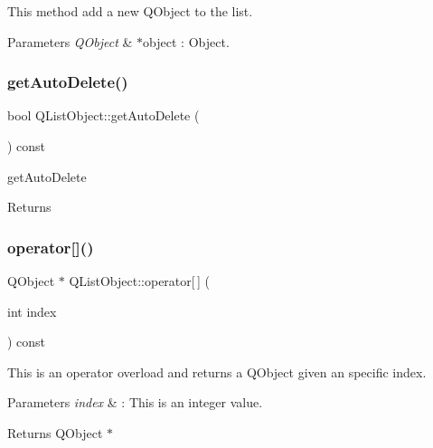 This method add a new Q\+Object to the list. 


\begin{DoxyParams}{Parameters}
{\em Q\+Object} & $\ast$object \+: Object. \\
\hline
\end{DoxyParams}
\mbox{\label{class_q_list_object_ad9d1f7e3c9f2563bcded31b02edc06fb}} 
\subsubsection{\texorpdfstring{get\+Auto\+Delete()}{getAutoDelete()}}
{\footnotesize\ttfamily bool Q\+List\+Object\+::get\+Auto\+Delete (\begin{DoxyParamCaption}{ }\end{DoxyParamCaption}) const}



get\+Auto\+Delete 

\begin{DoxyReturn}{Returns}

\end{DoxyReturn}
\mbox{\label{class_q_list_object_a6f07490df1b1ba2ed37c7f322e12017b}} 
\subsubsection{\texorpdfstring{operator[]()}{operator[]()}}
{\footnotesize\ttfamily Q\+Object $\ast$ Q\+List\+Object\+::operator\mbox{[}$\,$\mbox{]} (\begin{DoxyParamCaption}\item[{int}]{index }\end{DoxyParamCaption}) const}



This is an operator overload and returns a Q\+Object given an specific index. 


\begin{DoxyParams}{Parameters}
{\em index} & \+: This is an integer value. \\
\hline
\end{DoxyParams}
\begin{DoxyReturn}{Returns}
Q\+Object $\ast$ 
\end{DoxyReturn}
\mbox{\label{class_q_list_object_af6bc1883142f976bfd3e82c9d0c030bb}} 
